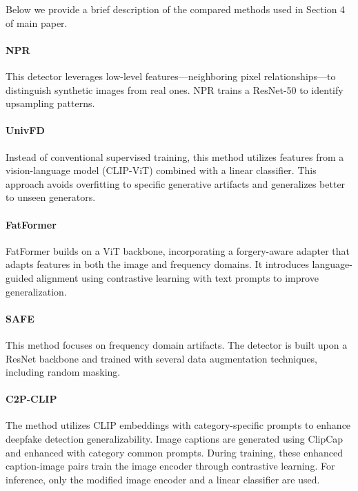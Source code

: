 \documentclass{article}
\begin{document}
Below we provide a brief description of the compared methods used in Section 4 of main paper.

\paragraph{NPR \cite{cozzolino2024zero}} This detector leverages low-level features—neighboring pixel relationships—to distinguish synthetic images from real ones. NPR trains a ResNet-50 to identify upsampling patterns.

\paragraph{UnivFD \cite{ojha2023towards}}  Instead of conventional supervised training, this method utilizes features from a vision-language model (CLIP-ViT) combined with a linear classifier. This approach avoids overfitting to specific generative artifacts and generalizes better to unseen generators.

\paragraph{FatFormer \cite{liu2024forgery}} FatFormer builds on a ViT backbone, incorporating a forgery-aware adapter that adapts features in both the image and frequency domains. It introduces language-guided alignment using contrastive learning with text prompts to improve generalization.


\paragraph{SAFE \cite{li2024improving}} This method focuses on frequency domain artifacts. The detector is built upon a ResNet backbone and trained with several data augmentation techniques, including random masking.

\paragraph{C2P-CLIP \cite{tan2024c2p}} The method utilizes CLIP embeddings with category-specific prompts to enhance deepfake detection generalizability. Image captions are generated using ClipCap and enhanced with category common prompts. During training, these enhanced caption-image pairs train the image encoder through contrastive learning. For inference, only the modified image encoder and a linear classifier are used.
\end{document}

